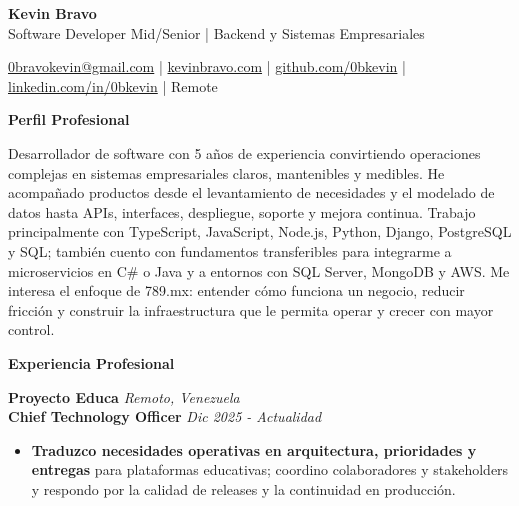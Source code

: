 \documentclass[10pt]{article}
\newcommand{\sectiontitle}[1]{%
    \vspace{4pt}
    \begin{center}
        \textbf{#1}
    \end{center}
    \vspace{-5pt}
}
\begin{document}
\raggedright

\begin{center}
    {\LARGE \textbf{Kevin Bravo}}\\
    Software Developer Mid/Senior | Backend y Sistemas Empresariales \\
    \hrulefill
\end{center}

\begin{center}
    \href{mailto:0bravokevin@gmail.com}{0bravokevin@gmail.com}
    | \href{https://kevinbravo.com}{kevinbravo.com}
    | \href{https://github.com/0bkevin}{github.com/0bkevin}
    | \href{https://www.linkedin.com/in/0bkevin/}{linkedin.com/in/0bkevin}
    | Remote
\end{center}

\fontsize{10}{11.3}\selectfont

\sectiontitle{Perfil Profesional}
Desarrollador de software con 5 años de experiencia convirtiendo operaciones complejas en sistemas empresariales claros, mantenibles y medibles. He acompañado productos desde el levantamiento de necesidades y el modelado de datos hasta APIs, interfaces, despliegue, soporte y mejora continua. Trabajo principalmente con TypeScript, JavaScript, Node.js, Python, Django, PostgreSQL y SQL; también cuento con fundamentos transferibles para integrarme a microservicios en C\# o Java y a entornos con SQL Server, MongoDB y AWS. Me interesa el enfoque de 789.mx: entender cómo funciona un negocio, reducir fricción y construir la infraestructura que le permita operar y crecer con mayor control.

\sectiontitle{Experiencia Profesional}

\textbf{Proyecto Educa} \hfill \textit{Remoto, Venezuela} \\
\textbf{Chief Technology Officer} \hfill \textit{Dic 2025 - Actualidad}
\begin{itemize}
    \item \textbf{Traduzco necesidades operativas en arquitectura, prioridades y entregas} para plataformas educativas; coordino colaboradores y stakeholders y respondo por la calidad de releases y la continuidad en producción.
\end{itemize}
\end{document}
